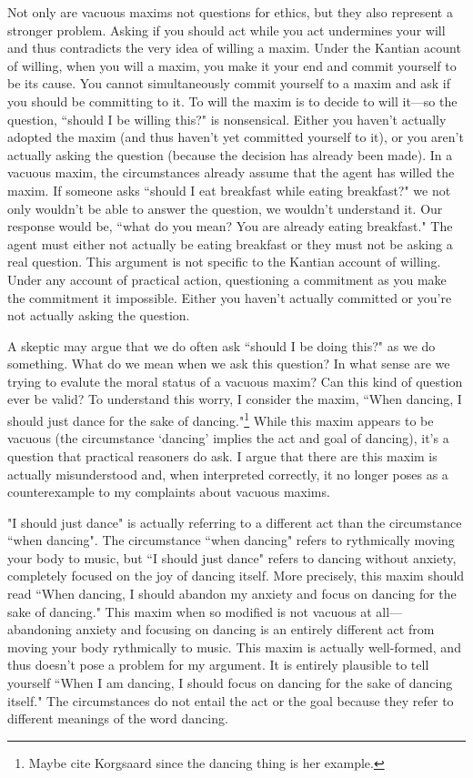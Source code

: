 \begin{isabellebody}
\begin{isamarkuptext}
Not only are vacuous maxims not questions for ethics, but they also represent a 
stronger problem. Asking if you should act while you act undermines your will and thus contradicts
the very idea of willing a maxim. 
Under the Kantian acount of willing, when you will a maxim, you make it your end and commit yourself 
to be its cause. You cannot simultaneously commit yourself to a maxim and ask if you should be committing to it. To 
will the maxim is to decide to will it—so the question, ``should I be 
willing this?" is nonsensical. Either you haven't actually adopted the maxim (and thus haven't yet 
committed yourself to it), or you aren't
actually asking the question (because the decision has already been made). In a vacuous maxim, 
the circumstances already assume that the agent 
has willed the maxim. If someone asks ``should I eat breakfast while eating breakfast?" we not only 
wouldn't be able to answer the question, we wouldn't understand it. Our response would be, ``what 
do you mean? You are already eating breakfast." The agent must either not actually be eating breakfast or 
they must not be asking a real question. This argument is not specific to the Kantian account of willing. 
Under any account of practical action, questioning a commitment as you make the commitment it impossible. 
Either you haven't actually committed or you're not actually asking the question.

A skeptic may argue that we do often ask ``should I be doing this?" as we do something. What do we mean when 
we ask this question? In what sense are we trying to evalute the moral status of a vacuous maxim?
Can this kind of question ever be valid? To understand this worry, I consider the maxim, 
``When dancing, I should just dance for the sake of dancing."\footnote{Maybe cite Korgsaard since the
dancing thing is her example.} While this maxim appears to be vacuous (the 
circumstance `dancing' implies the act and goal of dancing), it's a question that practical reasoners 
do ask. I argue that there are this maxim is actually misunderstood and, when interpreted correctly,
it no longer poses as a counterexample to my complaints about vacuous maxims.

"I should just dance" is actually referring to a different act than the circumstance ``when dancing". 
The circumstance ``when dancing" refers 
to rythmically moving your body to music, but ``I should just dance" refers to dancing without anxiety, 
completely focused on the joy of dancing itself. More precisely, this maxim should read ``When 
dancing, I should abandon my anxiety and focus on dancing for the sake of dancing." This maxim when so 
modified is not vacuous at all—abandoning anxiety and focusing on dancing is an entirely different act 
from moving your body rythmically to music. This maxim is actually well-formed, and thus doesn't
pose a problem for my argument. It is entirely plausible to tell yourself ``When I am dancing, I should focus 
on dancing for the sake of dancing itself." The circumstances do not entail the act or the goal because 
they refer to different meanings of the word dancing. 


\end{isamarkuptext}
\end{isabellebody}
